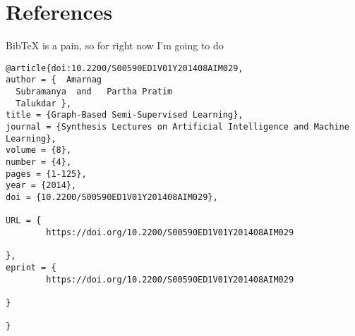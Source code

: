 \documentclass{article}
\begin{document}
\section{References}
BibTeX is a pain, so for right now I'm going to do

\begin{verbatim}
@article{doi:10.2200/S00590ED1V01Y201408AIM029,
author = {  Amarnag 
  Subramanya  and   Partha Pratim 
  Talukdar },
title = {Graph-Based Semi-Supervised Learning},
journal = {Synthesis Lectures on Artificial Intelligence and Machine Learning},
volume = {8},
number = {4},
pages = {1-125},
year = {2014},
doi = {10.2200/S00590ED1V01Y201408AIM029},

URL = { 
        https://doi.org/10.2200/S00590ED1V01Y201408AIM029
    
},
eprint = { 
        https://doi.org/10.2200/S00590ED1V01Y201408AIM029
    
}

}
\end{verbatim}
\end{document}
